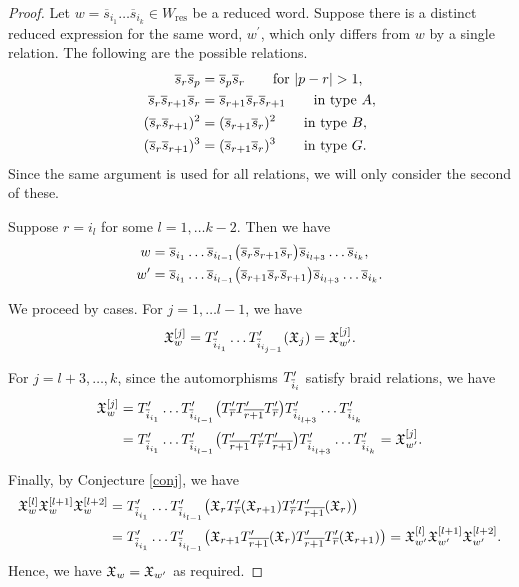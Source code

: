 \documentclass[a4 paper, 10pt]{article}
\begin{document}
\begin{proof}
Let $w = \overline{s}_{i_1} \dots \overline{s}_{i_k} \in W_{\text{res}}$ be a reduced word. Suppose there is a distinct reduced expression for the same word, $w^{\prime}$, which only differs from $w$ by a single relation. The following are the possible relations.
\begin{align*}
 \overline{s}_r\overline{s}_p &= \overline{s}_p\overline{s}_r \qquad \mbox{for $|p-r| > 1$},\\
 \overline{s}_r\overline{s}_{r+1}\overline{s}_r &= \overline{s}_{r+1}\overline{s}_r\overline{s}_{r+1} \qquad \mbox{in type $A$},\\
 (\overline{s}_r\overline{s}_{r+1})^2 &= (\overline{s}_{r+1}\overline{s}_{r})^2 \qquad \mbox{in type $B$},\\
 (\overline{s}_r\overline{s}_{r+1})^3 &= (\overline{s}_{r+1}\overline{s}_r)^3 \qquad \mbox{in type $G$}.
\end{align*}
\noindent Since the same argument is used for all relations, we will only consider the second of these. 

Suppose $r = i_l$ for some $l = 1, \dots k-2$. Then we have
\begin{align*}
	w &= \overline{s}_{i_1} \dots \overline{s}_{i_{l-1}} \big( \overline{s}_r\overline{s}_{r+1}\overline{s}_r \big) \overline{s}_{i_{l+3}} \dots \overline{s}_{i_k}, \\
	w^{\prime} &= \overline{s}_{i_1} \dots \overline{s}_{i_{l-1}} \big(\overline{s}_{r+1}\overline{s}_r\overline{s}_{r+1} \big) \overline{s}_{i_{l+3}} \dots \overline{s}_{i_k}.
\end{align*}

\noindent We proceed by cases. For $j = 1, \dots l-1$, we have 
\begin{align*}
\mathfrak{X}_w^{[j]} = T^{\prime}_{\overline{i}_{i_1}} \dots T^{\prime}_{\overline{i}_{i_{j-1}}}(\mathfrak{X}_j) = \mathfrak{X}_{w^{\prime}}^{[j]}.
\end{align*}

\noindent For $j = l+3, \dots, k$, since the automorphisms $T^{\prime}_{\overline{i}_{i}}$ satisfy braid relations, we have
\begin{align*}
\mathfrak{X}_w^{[j]} &= T^{\prime}_{\overline{i}_{i_1}} \dots T^{\prime}_{\overline{i}_{i_{l-1}}} \big( T^{\prime}_{\overline{r}}T^{\prime}_{\overline{r+1}}T^{\prime}_{\overline{r}} \big) T^{\prime}_{\overline{i}_{i_{l+3}}} \dots T^{\prime}_{\overline{i}_{i_k}}\\
	&= T^{\prime}_{\overline{i}_{i_1}} \dots T^{\prime}_{\overline{i}_{i_{l-1}}} \big( T^{\prime}_{\overline{r+1}}T^{\prime}_{\overline{r}}T^{\prime}_{\overline{r+1}} \big) T^{\prime}_{\overline{i}_{i_{l+3}}} \dots T^{\prime}_{\overline{i}_{i_k}} = \mathfrak{X}_{w^{\prime}}^{[j]}.
\end{align*}

\noindent Finally, by Conjecture \ref{conj}, we have
\begin{align*}
\mathfrak{X}_{w}^{[l]}\mathfrak{X}_{w}^{[l+1]}\mathfrak{X}_{w}^{[l+2]} &= T^{\prime}_{\overline{i}_{i_1}} \dots T^{\prime}_{\overline{i}_{i_{l-1}}} \big( \mathfrak{X}_r T^{\prime}_{\overline{r}}(\mathfrak{X}_{r+1})T^{\prime}_{\overline{r}}T^{\prime}_{\overline{r+1}}(\mathfrak{X}_r) \big)\\
	&= T^{\prime}_{\overline{i}_{i_1}} \dots T^{\prime}_{\overline{i}_{i_{l-1}}} \big( \mathfrak{X}_{r+1} T^{\prime}_{\overline{r+1}}(\mathfrak{X}_{r})T^{\prime}_{\overline{r+1}}T^{\prime}_{\overline{r}}(\mathfrak{X}_{r+1}) \big) = \mathfrak{X}_{w^{\prime}}^{[l]}\mathfrak{X}_{w^{\prime}}^{[l+1]}\mathfrak{X}_{w^{\prime}}^{[l+2]}.
\end{align*}
\noindent Hence, we have $\mathfrak{X}_w = \mathfrak{X}_{w^\prime}$ as required.


\end{proof}
\end{document}
